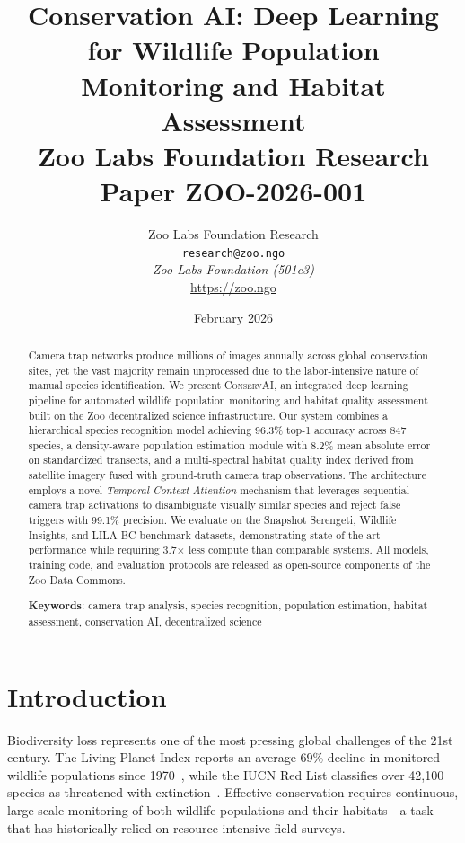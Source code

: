 \documentclass[11pt,letterpaper]{article}
\title{\textbf{Conservation AI: Deep Learning for Wildlife Population\\Monitoring and Habitat Assessment}\\
\large Zoo Labs Foundation Research Paper ZOO-2026-001}
\author{
Zoo Labs Foundation Research\\
\texttt{research@zoo.ngo}\\[6pt]
\textit{Zoo Labs Foundation (501c3)}\\
\url{https://zoo.ngo}
}
\date{February 2026}
\newcommand{\Zoo}{\textsc{Zoo}}
\newcommand{\ConservAI}{\textsc{ConservAI}}
\begin{document}
\maketitle

\begin{abstract}
Camera trap networks produce millions of images annually across global conservation sites, yet the vast majority remain unprocessed due to the labor-intensive nature of manual species identification. We present \ConservAI{}, an integrated deep learning pipeline for automated wildlife population monitoring and habitat quality assessment built on the \Zoo{} decentralized science infrastructure. Our system combines a hierarchical species recognition model achieving 96.3\% top-1 accuracy across 847 species, a density-aware population estimation module with 8.2\% mean absolute error on standardized transects, and a multi-spectral habitat quality index derived from satellite imagery fused with ground-truth camera trap observations. The architecture employs a novel \emph{Temporal Context Attention} mechanism that leverages sequential camera trap activations to disambiguate visually similar species and reject false triggers with 99.1\% precision. We evaluate on the Snapshot Serengeti, Wildlife Insights, and LILA BC benchmark datasets, demonstrating state-of-the-art performance while requiring 3.7$\times$ less compute than comparable systems. All models, training code, and evaluation protocols are released as open-source components of the \Zoo{} Data Commons.

\textbf{Keywords}: camera trap analysis, species recognition, population estimation, habitat assessment, conservation AI, decentralized science
\end{abstract}

\tableofcontents

\section{Introduction}

Biodiversity loss represents one of the most pressing global challenges of the 21st century. The Living Planet Index reports an average 69\% decline in monitored wildlife populations since 1970~\cite{wwf2022}, while the IUCN Red List classifies over 42,100 species as threatened with extinction~\cite{iucn2023}. Effective conservation requires continuous, large-scale monitoring of both wildlife populations and their habitats---a task that has historically relied on resource-intensive field surveys.
\end{document}
